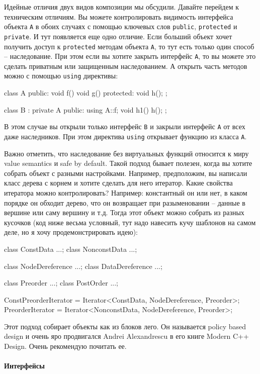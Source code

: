 \documentclass{article}
\begin{document}
Идейные отличия двух видов композиции мы обсудили. Давайте перейдем к техническим отличиям. Вы можете контролировать видимость интерфейса объекта \verb"A" в обоих случаях с помощью ключевых слов \verb"public", \verb"protected" и \verb"private". И тут появляется еще одно отличие. Если больший объект хочет получить доступ к \verb"protected" методам объекта \verb"A", то тут есть только один способ -- наследование. При этом если вы хотите закрыть интерфейс \verb"A", то вы можете это сделать приватным или защищенным наследованием. А открыть часть методов можно с помощью \verb"using" директивы:
\begin{cppcode}
class A {
public:
  void f() {}
  void g() {}
protected:
  void h();
};

class B : private A {
public:
  using A::f;
  void h1() {
    h();
  }
};
\end{cppcode}
В этом случае вы открыли только интерфейс \verb"B" и закрыли интерфейс \verb"A" от всех даже наследников. При этом директива \verb"using" открывает функцию из класса \verb"A".

Важно отметить, что наследование без виртуальных функций относится к миру value semantics и safe by default. Такой подход бывает полезен, когда вы хотите собрать объект с разными настройками. Например, предположим, вы написали класс дерева с корнем и хотите сделать для него итератор. Какие свойства итератора можно контролировать? Например: константный он или нет, в каком порядке он обходит дерево, что он возвращает при разыменовании -- данные в вершине или саму вершину и т.д. Тогда этот объект можно собрать из разных кусочков (код ниже весьма условный, тут надо навесить кучу шаблонов на самом деле, но я хочу продемонстрировать идею):
\begin{cppcode}
class ConstData {...};
class NonconstData {...};

class NodeDereference {...};
class DataDereference {...};

class Preorder {...};
class PostOrder {...};

ConstPreorderIterator = Iterator<ConstData, NodeDereference, Preorder>;
PreorderIterator = Iterator<NonconstData, NodeDereference, Preorder>;
\end{cppcode}
Этот подход собирает объекты как из блоков лего. Он называется policy based design и очень яро продвигался Andrei Alexandrescu в его книге Modern C++ Design. Очень рекомендую почитать ее.

\paragraph{Интерфейсы}
\end{document}
